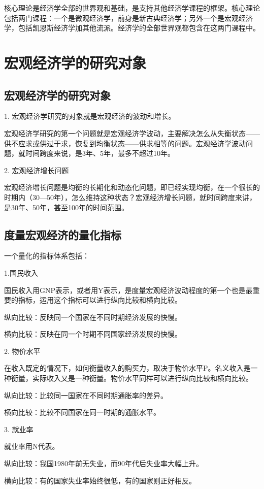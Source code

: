 \documentclass{article}
\begin{document}
核心理论是经济学全部的世界观和基础，是支持其他经济学课程的框架。核心理论包括两门课程：一个是微观经济学，前身是新古典经济学；另外一个是宏观经济学，包括凯恩斯经济学加其他流派。经济学的全部世界观都包含在这两门课程中。
\section{宏观经济学的研究对象}
\subsection{宏观经济学的研究对象}
1. 宏观经济学研究的对象就是宏观经济的波动和增长。

宏观经济学研究的第一个问题就是宏观经济学波动，主要解决怎么从失衡状态——供不应求或供过于求，恢复到均衡状态——供求相等的问题。宏观经济学波动问题，就时间跨度来说，是3年、5年，最多不超过10年。

\hspace*{\fill}

2. 宏观经济增长问题

宏观经济增长问题是均衡的长期化和动态化问题，即已经实现均衡，在一个很长的时期内（30—50年），怎么维持这种状态？宏观经济增长问题，就时间跨度来讲，是30年、50年，甚至100年的时间范围。

\subsection{度量宏观经济的量化指标}
一个量化的指标体系包括：

1.国民收入

国民收入用GNP表示，或者用Y表示，是度量宏观经济波动程度的第一个也是最重要的指标，运用这个指标可以进行纵向比较和横向比较。

纵向比较：反映同一个国家在不同时期经济发展的快慢。

横向比较：反映在同一个时期不同国家经济发展的快慢。

2. 物价水平

在收入既定的情况下，如何衡量收入的购买力，取决于物价水平P。名义收入是一种衡量，实际收入又是一种衡量。物价水平同样可以进行纵向比较和横向比较。

纵向比较：比较同一国家在不同时期通胀率的差异。

横向比较：比较不同国家在同一时期的通胀水平。

3. 就业率

就业率用N代表。

纵向比较：我国1980年前无失业，而90年代后失业率大幅上升。

横向比较：有的国家失业率始终很低，有的国家则正好相反。
\end{document}
